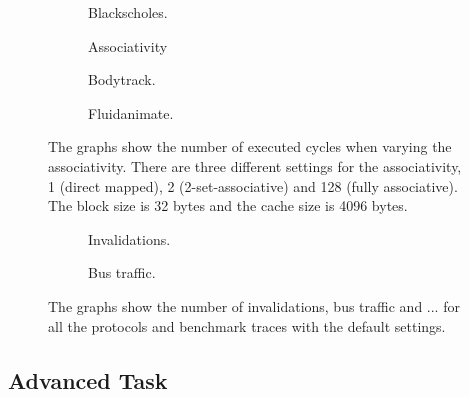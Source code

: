 \begin{figure}[H]
    \centering
    \begin{subfigure}[b]{0.33\textwidth}
        \centering
        \caption{Blackscholes.}
        \label{fig:associativity_blackscholes}
    \end{subfigure}%
    \hfill
    \begin{subfigure}[b]{0.33\textwidth}
        \centering
        Associativity\par\medskip
        \caption{Bodytrack.}
        \label{fig:associativity_bodytrack}
    \end{subfigure}%
    \hfill
    \begin{subfigure}[b]{0.33\textwidth}
        \centering
        \caption{Fluidanimate.}
        \label{fig:associativity_fluidanimate}
    \end{subfigure}
    \hfill
    \caption{The graphs show the number of executed cycles when varying the associativity. There are three different settings for the associativity, 1 (direct mapped), 2 (2-set-associative) and 128 (fully associative). The block size is 32 bytes and the cache size is 4096 bytes.}
    \label{fig:associativity}
\end{figure}

\begin{figure}[H]
    \centering
    \begin{subfigure}[b]{0.33\textwidth}
        \centering
        \caption{Invalidations.}
        \label{fig:invalidations}
    \end{subfigure}%
    \hfill
    \begin{subfigure}[b]{0.33\textwidth}
        \centering
        \caption{Bus traffic.}
        \label{fig:bus_traffic}
    \end{subfigure}%
    \hfill
    \begin{subfigure}[b]{0.33\textwidth}
        \centering
        \caption{}
        \label{fig:}
    \end{subfigure}
    \hfill
    \caption{The graphs show the number of invalidations, bus traffic and ... for all the protocols and benchmark traces with the default settings.}
    \label{fig:}
\end{figure}

\subsection{Advanced Task}\label{results:advanced}

